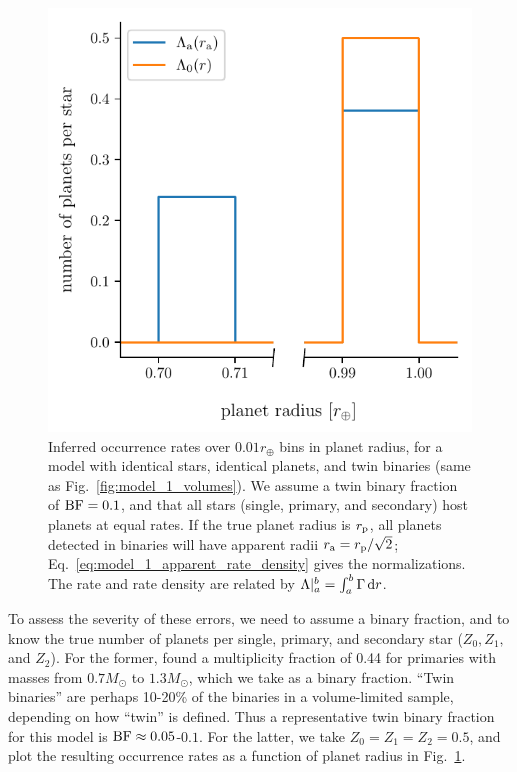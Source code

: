 \documentclass[12pt,modern]{aastex61}
\renewcommand{\a}{_{\rm a}}
\newcommand{\p}{_{\rm p}}
\begin{document}
\begin{figure}[!tb]
    \begin{center}
        \includegraphics[width=.6\textwidth]{figures/occ_rate_vs_radius_model_1_brokenx.pdf}
    \end{center}
    \vspace{-0.5cm}
    \caption{
        Inferred occurrence rates over $0.01r_\oplus$ bins in planet 
        radius, for a model with identical stars, identical planets, and twin 
        binaries (same as Fig.~\ref{fig:model_1_volumes}).
        We assume a twin binary fraction of ${\rm BF}=0.1$, and that all 
        stars (single, primary, and secondary) host planets at equal 
        rates.
        If the true planet radius is $r\p$, all planets detected in binaries 
        will have apparent radii $r\a = r\p/\sqrt{2}$;
        Eq.~\ref{eq:model_1_apparent_rate_density} gives the normalizations.
        The rate and rate density are related by $\Lambda|_a^b = 
        \int_{a}^{b}\Gamma\,{\rm d}r$.
    }
    \label{fig:occ_rate_model_1}
\end{figure}

To assess the severity of these errors, we need to assume a binary fraction, 
and to know the true number of planets per single, primary, and secondary star 
($Z_0,Z_1,$ and $Z_2$).
For the former,
\citet{raghavan_survey_2010} found a multiplicity 
fraction of 0.44 for primaries with masses from $0.7M_\odot$ to $1.3M_\odot$, 
which we take as a binary fraction. 
``Twin binaries'' are perhaps 10-20\% of the binaries in a volume-limited 
sample, depending on how ``twin'' is defined.
Thus a representative twin binary fraction for this model is ${\rm BF}\approx 
0.05$-$0.1$. 
For the latter, we take $Z_0=Z_1=Z_2=0.5$, and plot the resulting occurrence 
rates as a function of planet radius in Fig.~\ref{fig:occ_rate_model_1}.
\end{document}
